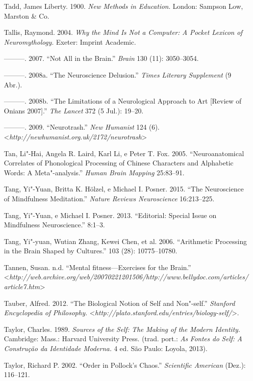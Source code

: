 Tadd, James Liberty. 1900. \emph{New Methods in Education}. London:
Sampson Low, Marston \& Co.

Tallis, Raymond. 2004. \emph{Why the Mind Is Not a Computer: A Pocket
Lexicon of Neuromythology.} Exeter: Imprint Academic.

---------. 2007. ``Not All in the Brain.'' \emph{Brain} 130 (11):
3050--3054.

---------. 2008a. ``The Neuroscience Delusion.'' \emph{Times Literary
Supplement} (9 Abr.).

---------. 2008b. ``The Limitations of a Neurological Approach to Art
{[}Review of Onians 2007{]}.'' \emph{The Lancet} 372 (5 Jul.): 19--20.

---------. 2009. ``Neurotrash.'' \emph{New Humanist} 124 (6).
\textless{}\emph{http://newhumanist.org.uk/2172/neurotrash}\textgreater{}

Tan, Li"-Hai, Angela R. Laird, Karl Li, e Peter T. Fox. 2005.
``Neuroanatomical Correlates of Phonological Processing of Chinese
Characters and Alphabetic Words: A Meta"-analysis.'' \emph{Human Brain
Mapping} 25:83--91.

Tang, Yi"-Yuan, Britta K. Hölzel, e Michael I. Posner. 2015. ``The
Neuroscience of Mindfulness Meditation.'' \emph{Nature Reviews
Neuroscience} 16:213--225.

Tang, Yi"-Yuan, e Michael I. Posner. 2013. ``Editorial: Special Issue on
Mindfulness Neuroscience.'' \emph{} 8:1--3.

Tang, Yi"-yuan, Wutian Zhang, Kewei Chen, et al. 2006. ``Arithmetic
Processing in the Brain Shaped by Cultures.'' \emph{} 103 (28):
10775--10780.

Tannen, Susan. n.d. ``Mental fitness---Exercises for the Brain.''
\textless{}\emph{http://web.archive.org/web/20070221201506/http://www.bellydoc.com/articles/article7.htm}\textgreater{}

Tauber, Alfred. 2012. ``The Biological Notion of Self and Non"-self.''
\emph{Stanford Encyclopedia of Philosophy.}
\textless{}\emph{http://plato.stanford.edu/entries/biology-self/}\textgreater{}.

Taylor, Charles. 1989. \emph{Sources of the Self: The Making of the
Modern Identity.} Cambridge: Mass.: Harvard University Press. (trad.
port.: \emph{As Fontes do Self: A Construção da Identidade Moderna.} 4
ed\emph{.} São Paulo: Loyola, 2013).

Taylor, Richard P. 2002. ``Order in Pollock's Chaos.'' \emph{Scientific
American} (Dez.): 116--121.

